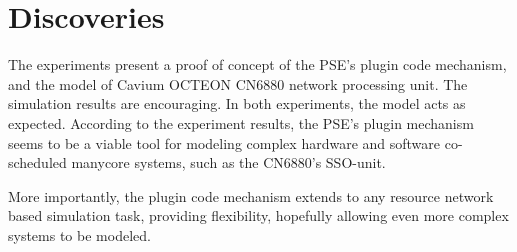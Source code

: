 \section{Discoveries}
The experiments present a proof of concept of the PSE's plugin code mechanism, and the model of Cavium OCTEON CN6880 network processing unit. The simulation results are encouraging. In both experiments, the model acts as expected. According to the experiment results, the PSE's plugin mechanism seems to be a viable tool for modeling complex hardware and software co-scheduled manycore systems, such as the CN6880's SSO-unit.

More importantly, the plugin code mechanism extends to any resource network based simulation task, providing flexibility, hopefully allowing even more complex systems to be modeled.

